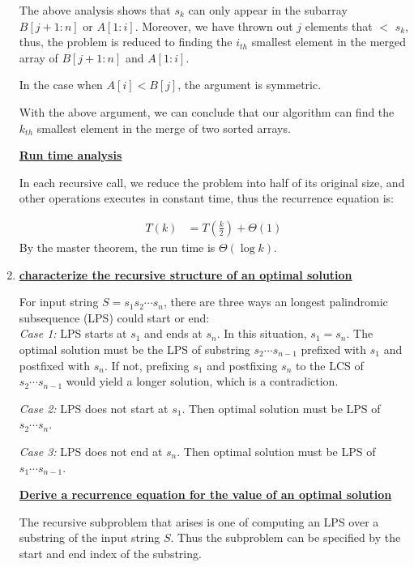 \documentclass[11pt]{article}
\begin{document}
\begin{enumerate}
  The above analysis shows that $s_k$ can only appear in the subarray
  $B[j+1:n]$ or $A[1:i]$. Moreover, we have thrown out $j$ elements
  that $<$ $s_k$, thus, the problem is reduced to finding the $i_{th}$
  smallest element in the merged array of $B[j+1:n]$ and $A[1:i]$.

  In the case when $A[i] < B[j]$, the argument is symmetric.

  With the above argument, we can conclude that our algorithm can find
  the $k_{th}$ smallest element in the merge of two sorted arrays.

  \underline{\textbf{Run time analysis}}

  In each recursive call, we reduce the problem into half of its
  original size, and other operations executes in constant time, thus
  the recurrence equation is:

  \begin{equation}
    \begin{split}
      T(k) &= T(\frac{k}{2}) + \Theta(1)
    \end{split}
  \end{equation}
  By the master theorem, the run time is $\Theta(\log {k})$.

\item %

  \underline{\textbf{characterize the recursive structure of an
      optimal solution}} 

  For input string $S = s_1s_2 \cdots s_n$, there are three ways an
  longest palindromic subsequence (LPS) could start or end:\\
  \emph{Case 1:} LPS starts at $s_1$ and ends at $s_n$. In this
  situation, $s_1=s_n$. The optimal solution must be the LPS of
  substring $s_2 \cdots s_{n-1}$ prefixed with $s_1$ and postfixed
  with $s_n$. If not, prefixing $s_1$ and postfixing $s_n$ to the LCS
  of $s_2 \cdots s_{n-1}$ would yield a longer solution, which is a
  contradiction.

  \emph{Case 2:} LPS does not start at $s_1$. Then optimal solution
  must be LPS of $s_2 \cdots s_{n}$.

  \emph{Case 3:} LPS does not end at $s_n$. Then optimal solution
  must be LPS of $s_1 \cdots s_{n-1}$.

  \underline{\textbf{Derive a recurrence equation for the value of an
      optimal solution}}

  The recursive subproblem that arises is one of computing an LPS over
  a substring of the input string $S$. Thus the subproblem can be
  specified by the start and end index of the substring. 


\end{enumerate}
\end{document}
